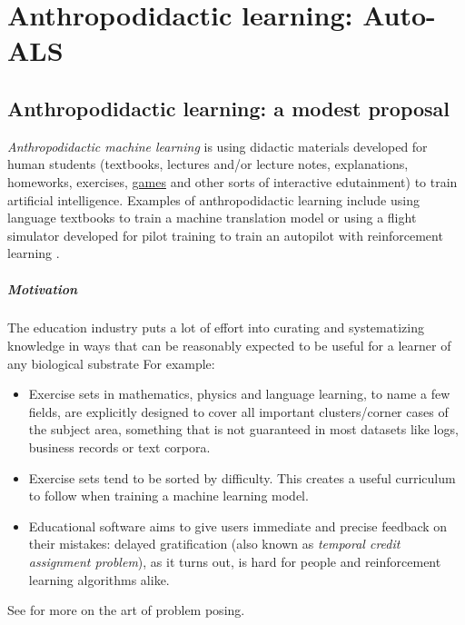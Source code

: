 \chapter{Anthropodidactic learning: Auto-ALS}
\label{ch:auto-als}

\section{Anthropodidactic learning: a modest proposal}
\label{sec:anthropodidactic}

\emph{Anthropodidactic machine learning} is using didactic materials developed for human students (textbooks, lectures and/or lecture notes, explanations, homeworks, exercises, \href{http://www.virtu-als.com/}{games} and other sorts of interactive edutainment) to train artificial intelligence.
Examples of anthropodidactic learning include using language textbooks to train a machine translation model or using a flight simulator developed for pilot training to train an autopilot with reinforcement learning \cite{staudingerXPlaneMLEnvironmentLearning2018}.

\paragraph{Motivation}

The education industry puts a lot of effort into curating and systematizing knowledge in ways that can be reasonably expected to be useful for a learner of any biological substrate
For example: 
\begin{itemize}
    \item Exercise sets in mathematics, physics and language learning, to name a few fields, are explicitly designed to cover all important clusters/corner cases of the subject area, something that is not guaranteed in most datasets like logs, business records or text corpora.
    \item Exercise sets tend to be sorted by difficulty. This creates a useful curriculum to follow when training a machine learning model.
    \item Educational software aims to give users immediate and precise feedback on their mistakes: delayed gratification (also known as \emph{temporal credit assignment problem}), as it turns out, is hard for people \cite{tobinDelayGratificationReview2010} and reinforcement learning algorithms alike.
\end{itemize}

See \cite{brownArtProblemPosing2005} for more on the art of problem posing.

